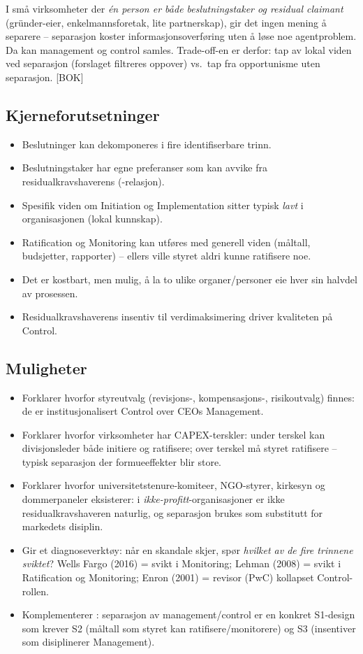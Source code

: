 I små virksomheter der \emph{én person er både beslutningstaker og residual claimant} (gründer-eier, enkelmannsforetak, lite partnerskap), gir det ingen mening å separere -- separasjon koster informasjonsoverføring uten å løse noe agentproblem. Da kan management og control samles. Trade-off-en er derfor: tap av lokal viden ved separasjon (forslaget filtreres oppover) vs.\ tap fra opportunisme uten separasjon. [BOK]

\subsection*{Kjerneforutsetninger}
\begin{itemize}
\item Beslutninger kan dekomponeres i fire identifiserbare trinn.
\item Beslutningstaker har egne preferanser som kan avvike fra residualkravshaverens (-relasjon).
\item Spesifik viden om Initiation og Implementation sitter typisk \emph{lavt} i organisasjonen (lokal kunnskap).
\item Ratification og Monitoring kan utføres med generell viden (måltall, budsjetter, rapporter) -- ellers ville styret aldri kunne ratifisere noe.
\item Det er kostbart, men mulig, å la to ulike organer/personer eie hver sin halvdel av prosessen.
\item Residualkravshaverens insentiv til verdimaksimering driver kvaliteten på Control.
\end{itemize}

\subsection*{Muligheter}
\begin{itemize}
\item Forklarer hvorfor styreutvalg (revisjons-, kompensasjons-, risikoutvalg) finnes: de er institusjonalisert Control over CEOs Management.
\item Forklarer hvorfor virksomheter har CAPEX-terskler: under terskel kan divisjonsleder både initiere og ratifisere; over terskel må styret ratifisere -- typisk separasjon der formueeffekter blir store.
\item Forklarer hvorfor universitetstenure-komiteer, NGO-styrer, kirkesyn og dommerpaneler eksisterer: i \emph{ikke-profitt}-organisasjoner er ikke residualkravshaveren naturlig, og separasjon brukes som substitutt for markedets disiplin.
\item Gir et diagnoseverktøy: når en skandale skjer, spør \emph{hvilket av de fire trinnene sviktet}? Wells Fargo (2016) = svikt i Monitoring; Lehman (2008) = svikt i Ratification og Monitoring; Enron (2001) = revisor (PwC) kollapset Control-rollen.
\item Komplementerer : separasjon av management/control er en konkret S1-design som krever S2 (måltall som styret kan ratifisere/monitorere) og S3 (insentiver som disiplinerer Management).
\end{itemize}

